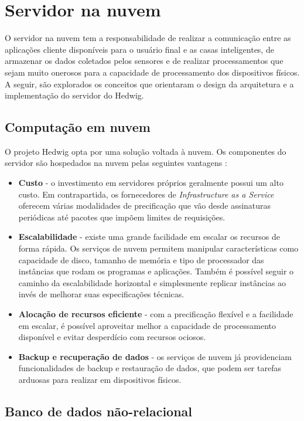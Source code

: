 \section{Servidor na nuvem}

O servidor na nuvem tem a responsabilidade de realizar a comunicação entre as aplicações cliente disponíveis para o usuário final e as casas inteligentes, de armazenar os dados coletados pelos sensores e de realizar processamentos que sejam muito onerosos para a capacidade de processamento dos dispositivos físicos. A seguir, são explorados os conceitos que orientaram o design da arquitetura e a implementação do servidor do Hedwig.

\subsection{Computação em nuvem}

O projeto Hedwig opta por uma solução voltada à nuvem. Os componentes do servidor são hospedados na nuvem pelas seguintes vantagens \cite{viswanathan}:

\begin{itemize}
\item \textbf{Custo} - o investimento em servidores próprios geralmente possui um alto custo. Em contrapartida, os fornecedores de \emph{Infrastructure as a Service} oferecem várias modalidades de precificação que vão desde assinaturas periódicas até pacotes que impõem limites de requisições.
\item \textbf{Escalabilidade} - existe uma grande facilidade em escalar os recursos de forma rápida. Os serviços de nuvem permitem manipular características como capacidade de disco, tamanho de memória e tipo de processador das instâncias que rodam os programas e aplicações. Também é possível seguir o caminho da escalabilidade horizontal e simplesmente replicar instâncias ao invés de melhorar suas especificações técnicas.
\item \textbf{Alocação de recursos eficiente} - com a precificação flexível e a facilidade em escalar, é possível aproveitar melhor a capacidade de processamento disponível e evitar desperdício com recursos ociosos.
\item \textbf{Backup e recuperação de dados} - os serviços de nuvem já providenciam funcionalidades de backup e restauração de dados, que podem ser tarefas arduosas para realizar em dispositivos físicos.
\end{itemize}

\subsection{Banco de dados não-relacional}

